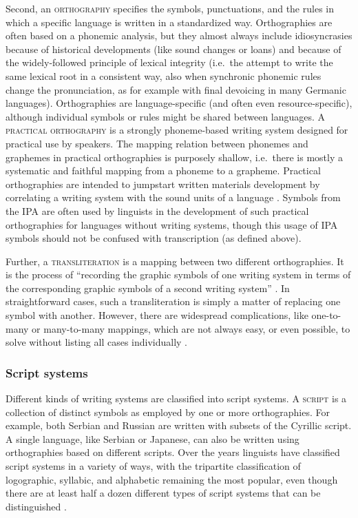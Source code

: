 Second, an \textsc{orthography} specifies the symbols, punctuations, and the
rules in which a specific language is written in a standardized way.
Orthographies are often based on a phonemic analysis, but they almost always
include idiosyncrasies because of historical developments (like sound changes or
loans) and because of the widely-followed principle of lexical integrity
(i.e.~the attempt to write the same lexical root in a consistent way, also when
synchronic phonemic rules change the pronunciation, as for example with final
devoicing in many Germanic languages). Orthographies are language-specific
(and often even resource-specific), although individual symbols or rules might
be shared between languages. A \textsc{practical orthography} is a strongly
phoneme-based writing system designed for practical use by speakers. The mapping
relation between phonemes and graphemes in practical orthographies is purposely
shallow, i.e.~there is mostly a systematic and faithful mapping from a phoneme
to a grapheme. Practical orthographies are intended to jumpstart written
materials development by correlating a writing system with the sound units of a
language \citep[cf.~][]{MeinhofJones1928}. Symbols from the IPA are often used
by linguists in the development of such practical orthographies for languages
without writing systems, though this usage of IPA symbols should not be confused
with transcription (as defined above). 

Further, a \textsc{transliteration} is a mapping between two different
orthographies. It is the process of ``recording the graphic symbols of one
writing system in terms of the corresponding graphic symbols of a second writing
system'' \citep[396]{Kemp2006}. In straightforward cases, such a transliteration
is simply a matter of replacing one symbol with another. However, there are
widespread complications, like one-to-many or many-to-many mappings, which are
not always easy, or even possible, to solve without listing all cases
individually \citep[cf.~][Ch.~2]{Moran2012}.

\subsubsection*{Script systems}

Different kinds of writing systems are classified into script
systems. A \textsc{script} is a collection of distinct symbols as
employed by one or more orthographies. For example, both Serbian and Russian are
written with subsets of the Cyrillic script. A single language, like Serbian or
Japanese, can also be written using orthographies based on different scripts.
Over the years linguists have classified script systems in a variety of ways,
with the tripartite classification of logographic, syllabic, and alphabetic
remaining the most popular, even though there are at least half a dozen
different types of script systems that can be distinguished
\citep{Daniels1990,Daniels1996}.

